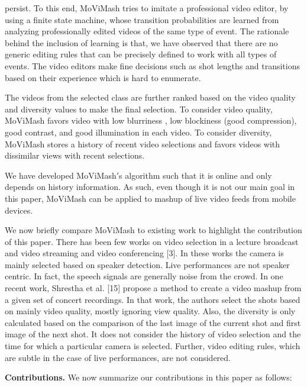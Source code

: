 \documentclass{sig-alternate-05-2015}
\begin{document}
persist. To this end, MoViMash tries to imitate a professional video
editor, by using a finite state machine, whose transition probabilities
are learned from analyzing professionally edited videos of the
same type of event. The rationale behind the inclusion of learning
is that, we have observed that there are no generic editing rules
that can be precisely defined to work with all types of events. The
video editors make fine decisions such as shot lengths and transitions
based on their experience which is hard to enumerate.\par
The videos from the selected class are further ranked based on
the video quality and diversity values to make the final selection.
To consider video quality, MoViMash favors video with low blurriness
, low blockiness (good compression), good contrast, and good
illumination in each video. To consider diversity, MoViMash stores
a history of recent video selections and favors videos with dissimilar
views with recent selections.\par
We have developed MoViMash$'$s algorithm such that it is online
and only depends on history information. As such, even though
it is not our main goal in this paper, MoViMash can be applied to
mashup of live video feeds from mobile devices.\par
We now briefly compare MoViMash to existing work to highlight
the contribution of this paper. There has been few works on
video selection in a lecture broadcast and video streaming \cite{economou1983green} \cite{warneke2001smart}
and video conferencing [3]. In these works the camera is mainly
selected based on speaker detection. Live performances are not
speaker centric. In fact, the speech signals are generally noise from
the crowd. In one recent work, Shrestha et al. [15] propose a
method to create a video mashup from a given set of concert recordings.
In that work, the authors select the shots based on mainly
video quality, mostly ignoring view quality. Also, the diversity is
only calculated based on the comparison of the last image of the
current shot and first image of the next shot. It does not consider
the history of video selection and the time for which a particular
camera is selected. Further, video editing rules, which are subtle in
the case of live performances, are not considered.\par
\textbf{Contributions.} We now summarize our contributions in this paper as follows:\\
\end{document}
